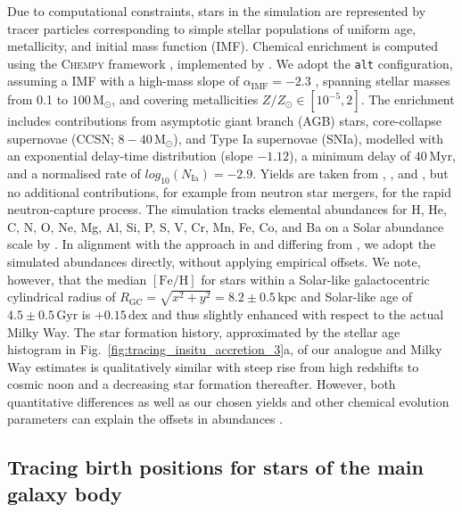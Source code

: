 \documentclass[fleqn,usenatbib]{mnras}
\begin{document}
Due to computational constraints, stars in the simulation are represented by tracer particles corresponding to simple stellar populations of uniform age, metallicity, and initial mass function (IMF). Chemical enrichment is computed using the \textsc{Chempy} framework \citep{Rybizki2017}, implemented by \citet{Buck2021}. We adopt the \texttt{alt} configuration, assuming a \citet{Chabrier2003} IMF with a high-mass slope of $\alpha_\text{IMF} = -2.3$ , spanning stellar masses from 0.1 to $100\,\mathrm{M_\odot}$, and covering metallicities $Z/Z_\odot \in [10^{-5},2]$. The enrichment includes contributions from asymptotic giant branch (AGB) stars, core-collapse supernovae (CCSN; $8 - 40\,\mathrm{M_\odot}$), and Type Ia supernovae (SNIa), modelled with an exponential delay-time distribution (slope $-1.12$), a minimum delay of $40\,\mathrm{Myr}$, and a normalised rate of $log_{10}(N_\mathrm{Ia}) = -2.9$. Yields are taken from \citet[][CCSN]{Chieffi2004}, \citet[][SNIa]{Seitenzahl2013}, and \citet[][AGB; \texttt{new\_fid} yields in \citealt{Buck2021}]{Karakas2016}, but no additional contributions, for example from neutron star mergers, for the rapid neutron-capture process. The simulation tracks elemental abundances for H, He, C, N, O, Ne, Mg, Al, Si, P, S, V, Cr, Mn, Fe, Co, and Ba on a Solar abundance scale by \citet{Asplund2009}. In alignment with the approach in \citet{Buder2025} and differing from \citet{Buder2024}, we adopt the simulated abundances directly, without applying empirical offsets. We note, however, that the median $\mathrm{[Fe/H]}$ for stars within a Solar-like galactocentric cylindrical radius of $R_\mathrm{GC} = \sqrt{x^2+y^2} = 8.2 \pm 0.5\,\mathrm{kpc}$ \citep{BlandHawthorn_Gerhard2016} and Solar-like age of $4.5 \pm 0.5\,\mathrm{Gyr}$ \citep{Soderblom2010} is $+0.15\,\mathrm{dex}$ and thus slightly enhanced with respect to the actual Milky Way. The star formation history, approximated by the stellar age histogram in Fig.~\ref{fig:tracing_insitu_accretion_3}a, of our analogue and Milky Way estimates \citep{Snaith2015} is qualitatively similar with steep rise from high redshifts to cosmic noon and a decreasing star formation thereafter. However, both quantitative differences as well as our chosen yields and other chemical evolution parameters can explain the offsets in abundances \citep[see also][]{Buck2021}.

\subsection{Tracing birth positions for stars of the main galaxy body}  \label{sec:data_birth_positions}
\end{document}
